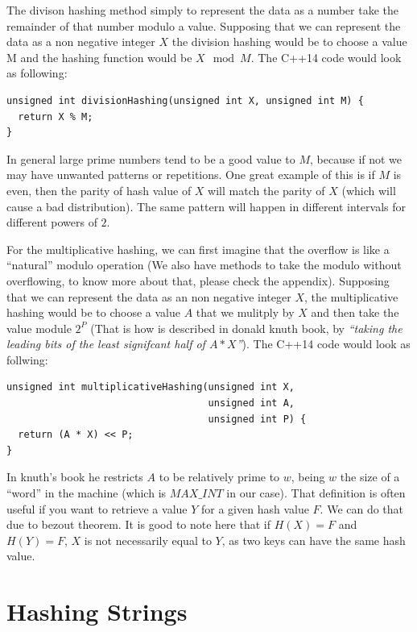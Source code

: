 The divison hashing method simply to represent the data as a number take the remainder of that number modulo a value. Supposing that we can represent the data as a non negative integer \( X \) the division hashing would be to choose a value M and the hashing function would be \( X \mod M \). The C++14 code would look as following:

\begin{lstlisting}
unsigned int divisionHashing(unsigned int X, unsigned int M) {
  return X % M;
}
\end{lstlisting}

In general large prime numbers tend to be a good value to \( M \), because if not we may have unwanted patterns or repetitions. One great example of this is if \( M \) is even, then the parity of hash value of \( X \) will match the parity of \( X \) (which will cause a bad distribution). The same pattern will happen in different intervals for different powers of \( 2 \).

For the multiplicative hashing, we can first imagine that the overflow is like a ``natural'' modulo operation (We also have methods to take the modulo without overflowing, to know more about that, please check the appendix). Supposing that we can represent the data as an non negative integer \( X \), the multiplicative hashing would be to choose a value \( A \) that we mulitply by \( X \) and then take the value module \( 2^P \) (That is how is described in donald knuth book, by \textit{``taking the leading bits of the least signifcant half of \( A * X \)''}). The C++14 code would look as follwing:

\medskip

\begin{lstlisting}
unsigned int multiplicativeHashing(unsigned int X,
                                   unsigned int A,
                                   unsigned int P) {
  return (A * X) << P; 
}
\end{lstlisting}

In knuth's book he restricts \( A \) to be relatively prime to \( w \), being \( w \) the size of a ``word'' in the machine (which is \( MAX\_INT \) in our case). That definition is often useful if you want to retrieve a value \( Y \) for a given hash value \( F \). We can do that due to bezout theorem. It is good to note here that if \( H(X) = F \) and \( H(Y) = F \), \( X \) is not necessarily equal to \( Y \), as two keys can have the same hash value.

\section{Hashing Strings}


